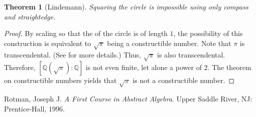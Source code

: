 \documentclass[12pt]{article}
\newtheorem{thm}{Theorem}
\begin{document}
\begin{thm}[Lindemann]
Squaring the circle is impossible using only compass and straightedge.
\end{thm}

\begin{proof}
By scaling so that the  of the circle is of length $1$, the possibility of this construction is equivalent to $\sqrt{\pi}$ being a constructible number.  Note that $\pi$ is transcendental.  (See  for more details.)  Thus, $\sqrt{\pi}$ is also transcendental.  Therefore, $[\mathbb{Q}(\sqrt{\pi})\!:\!\mathbb{Q}]$ is not even finite, let alone a power of $2$.  The theorem on constructible numbers yields that $\sqrt{\pi}$ is not a constructible number.
\end{proof}

\begin{thebibliography}{9}
 Rotman, Joseph J. {\em A First Course in Abstract Algebra}. Upper Saddle River, NJ: Prentice-Hall, 1996.
\end{thebibliography}
\end{document}
